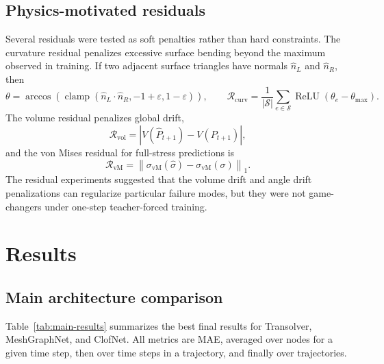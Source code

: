 \documentclass[11pt,a4paper,reqno]{amsart}
\theoremstyle{definition}
\theoremstyle{remark}
\numberwithin{equation}{section}
\newcommand{\norm}[1]{\left\lVert #1 \right\rVert}
\newcommand{\abs}[1]{\left\lvert #1 \right\rvert}
\newcommand{\relu}{\operatorname{ReLU}}
\newcommand{\vM}{\operatorname{vM}}
\begin{document}
\subsection{Physics-motivated residuals}

Several residuals were tested as soft penalties rather than hard constraints. The curvature residual penalizes excessive surface bending beyond the maximum observed in training. If two adjacent surface triangles have normals $\hat n_L$ and $\hat n_R$, then
\begin{equation}
    \theta=\arccos\left(\operatorname{clamp}(\hat n_L\cdot\hat n_R,-1+\varepsilon,1-\varepsilon)\right),
    \qquad
    \mathcal R_{\mathrm{curv}}=\frac{1}{|\mathcal S|}\sum_{e\in\mathcal S}\relu(\theta_e-\theta_{\max}).
\end{equation}
The volume residual penalizes global drift,
\begin{equation}
    \mathcal R_{\mathrm{vol}}=\abs{V(\hat P_{t+1})-V(P_{t+1})},
\end{equation}
and the von Mises residual for full-stress predictions is
\begin{equation}
    \mathcal R_{\vM}=\norm{\sigma_{\vM}(\hat\sigma)-\sigma_{\vM}(\sigma)}_1.
\end{equation}
The residual experiments suggested that the volume drift and angle drift penalizations can regularize particular failure modes, but they were not game-changers under one-step teacher-forced training.

\section{Results}
\label{sec:results}

\subsection{Main architecture comparison}\label{subsec:main-arch-comparison}

Table~\ref{tab:main-results} summarizes the best final results for Transolver, MeshGraphNet, and ClofNet. All metrics are MAE, averaged over nodes for a given time step, then over time steps in a trajectory, and finally over trajectories. 
\end{document}
